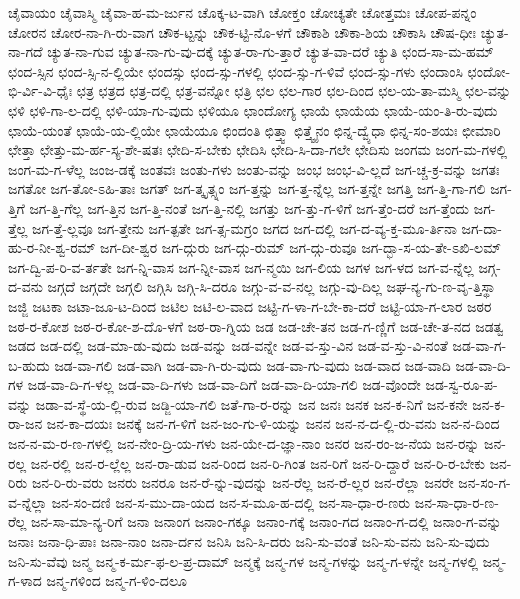 {ಚೈವಾಯಂ
ಚೈವಾಸ್ಮಿ
ಚೈವಾ-ಹ-ಮ-ರ್ಜುನ
ಚೊಕ್ಕ-ಟ-ವಾಗಿ
ಚೋಕ್ತಂ
ಚೋಚ್ಯತೇ
ಚೋತ್ತಮಃ
ಚೋಪ-ಪನ್ನಂ
ಚೋರನ
ಚೋರ-ನಾ-ಗಿ-ರು-ವಾಗ
ಚೌಕ-ಟ್ಟನ್ನು
ಚೌಕ-ಟ್ಟಿ-ನೊ-ಳಗೆ
ಚೌಕಾಶಿ
ಚೌಕಾ-ಶಿಯ
ಚೌಕಾಸಿ
ಚೌಷ-ಧೀಃ
ಚ್ಯುತ-ನಾ-ಗದೆ
ಚ್ಯುತ-ನಾ-ಗುವ
ಚ್ಯುತ-ನಾ-ಗು-ವು-ದಕ್ಕೆ
ಚ್ಯುತ-ರಾ-ಗು-ತ್ತಾರೆ
ಚ್ಯುತ-ವಾ-ದರೆ
ಚ್ಯುತಿ
ಛಂದ-ಸಾ-ಮ-ಹಮ್
ಛಂದ-ಸ್ಸಿನ
ಛಂದ-ಸ್ಸಿ-ನ-ಲ್ಲಿಯೇ
ಛಂದಸ್ಸು
ಛಂದ-ಸ್ಸು-ಗಳಲ್ಲಿ
ಛಂದ-ಸ್ಸು-ಗ-ಳಿವೆ
ಛಂದ-ಸ್ಸು-ಗಳು
ಛಂದಾಂಸಿ
ಛಂದೋ-ಭಿ-ರ್ವಿ-ವಿ-ಧೈಃ
ಛತ್ರ
ಛತ್ರದ
ಛತ್ರ-ದಲ್ಲಿ
ಛತ್ರ-ವನ್ನೋ
ಛತ್ರಿ
ಛಲ
ಛಲ-ಗಾರ
ಛಲ-ದಿಂದ
ಛಲ-ಯ-ತಾ-ಮಸ್ಮಿ
ಛಲ-ವನ್ನು
ಛಳಿ
ಛಳಿ-ಗಾ-ಲ-ದಲ್ಲಿ
ಛಳಿ-ಯಾ-ಗು-ವುದು
ಛಳಿಯೂ
ಛಾಂದೋಗ್ಯ
ಛಾಯೆ
ಛಾಯೆಯ
ಛಾಯೆ-ಯಂ-ತಿ-ರು-ವುದು
ಛಾಯೆ-ಯಂತೆ
ಛಾಯೆ-ಯ-ಲ್ಲಿಯೇ
ಛಾಯೆಯೂ
ಛಿಂದಂತಿ
ಛಿತ್ತ್ವಾ
ಛಿತ್ತ್ವೈನಂ
ಛಿನ್ನ-ದ್ವ್ಯೆಧಾ
ಛಿನ್ನ-ಸಂ-ಶಯಃ
ಛೀಮಾರಿ
ಛೇತ್ತಾ
ಛೇತ್ತು-ಮ-ರ್ಹ-ಸ್ಯ-ಶೇ-ಷತಃ
ಛೇದಿ-ಸ-ಬೇಕು
ಛೇದಿಸಿ
ಛೇದಿ-ಸಿ-ದಾ-ಗಲೇ
ಛೇದಿಸು
ಜಂಗಮ
ಜಂಗ-ಮ-ಗಳಲ್ಲಿ
ಜಂಗ-ಮ-ಗ-ಳೆಲ್ಲ
ಜಂಜ-ಡಕ್ಕೆ
ಜಂತವಃ
ಜಂತು-ಗಳು
ಜಂತು-ವನ್ನು
ಜಂಭ
ಜಂಭ-ವಿ-ಲ್ಲದೆ
ಜಗ-ಚ್ಚ-ಕ್ರ-ವನ್ನು
ಜಗತಃ
ಜಗತೋ
ಜಗ-ತೋ-ಽಹಿ-ತಾಃ
ಜಗತ್
ಜಗ-ತ್ಕೃತ್ಸ್ನಂ
ಜಗ-ತ್ತನ್ನು
ಜಗ-ತ್ತ-ನ್ನೆಲ್ಲ
ಜಗ-ತ್ತನ್ನೇ
ಜಗತ್ತಿ
ಜಗ-ತ್ತಿ-ಗಾ-ಗಲಿ
ಜಗ-ತ್ತಿಗೆ
ಜಗ-ತ್ತಿ-ಗೆಲ್ಲ
ಜಗ-ತ್ತಿನ
ಜಗ-ತ್ತಿ-ನಂತೆ
ಜಗ-ತ್ತಿ-ನಲ್ಲಿ
ಜಗತ್ತು
ಜಗ-ತ್ತು-ಗ-ಳಿಗೆ
ಜಗ-ತ್ತೆಂ-ದರೆ
ಜಗ-ತ್ತೆಂದು
ಜಗ-ತ್ತೆಲ್ಲ
ಜಗ-ತ್ತೆ-ಲ್ಲವೂ
ಜಗ-ತ್ತೇನು
ಜಗ-ತ್ಪತೇ
ಜಗ-ತ್ಸ-ಮಗ್ರಂ
ಜಗದ
ಜಗ-ದಲ್ಲಿ
ಜಗ-ದ-ವ್ಯ-ಕ್ತ-ಮೂ-ರ್ತಿನಾ
ಜಗ-ದಾ-ಹು-ರ-ನೀ-ಶ್ವ-ರಮ್
ಜಗ-ದೀ-ಶ್ವರ
ಜಗ-ದ್ಗುರು
ಜಗ-ದ್ಗು-ರುಮ್
ಜಗ-ದ್ಗು-ರುವೂ
ಜಗ-ದ್ಭಾ-ಸ-ಯ-ತೇ-ಽಖಿ-ಲಮ್
ಜಗ-ದ್ವಿ-ಪ-ರಿ-ವ-ರ್ತತೇ
ಜಗ-ನ್ನಿ-ವಾಸ
ಜಗ-ನ್ನೀ-ವಾಸ
ಜಗ-ನ್ಮಯಿ
ಜಗ-ಲಿಯ
ಜಗಳ
ಜಗ-ಳದ
ಜಗ-ವ-ನ್ನೆಲ್ಲ
ಜಗ್ಗ-ದ-ವನು
ಜಗ್ಗದೆ
ಜಗ್ಗದೇ
ಜಗ್ಗಲಿ
ಜಗ್ಗಿಸಿ
ಜಗ್ಗಿ-ಸಿ-ದರೂ
ಜಗ್ಗು-ವ-ವ-ನಲ್ಲ
ಜಗ್ಗು-ವು-ದಿಲ್ಲ
ಜಘ-ನ್ಯ-ಗು-ಣ-ವೃ-ತ್ತಿಸ್ಥಾ
ಜಜ್ಜಿ
ಜಟಕಾ
ಜಟಾ-ಜೂ-ಟ-ದಿಂದ
ಜಟಿಲ
ಜಟಿ-ಲ-ವಾದ
ಜಟ್ಟಿ-ಗ-ಳಾ-ಗ-ಬೇ-ಕಾ-ದರೆ
ಜಟ್ಟಿ-ಯಾ-ಗ-ಲಾರ
ಜಠರ
ಜಠ-ರ-ಕೋಶ
ಜಠ-ರ-ಕೋ-ಶ-ದೊ-ಳಗೆ
ಜಠ-ರಾ-ಗ್ನಿಯ
ಜಡ
ಜಡ-ಚೇ-ತನ
ಜಡ-ಗ-ಣ್ಣಿಗೆ
ಜಡ-ಚೇ-ತ-ನದ
ಜಡತ್ವ
ಜಡದ
ಜಡ-ದಲ್ಲಿ
ಜಡ-ಮಾ-ಡು-ವುದು
ಜಡ-ವನ್ನು
ಜಡ-ವನ್ನೇ
ಜಡ-ವ-ಸ್ತು-ವಿನ
ಜಡ-ವ-ಸ್ತು-ವಿ-ನಂತೆ
ಜಡ-ವಾ-ಗ-ಬ-ಹುದು
ಜಡ-ವಾ-ಗಲಿ
ಜಡ-ವಾಗಿ
ಜಡ-ವಾ-ಗಿ-ರು-ವುದು
ಜಡ-ವಾ-ಗು-ವುದು
ಜಡ-ವಾದ
ಜಡ-ವಾದಿ
ಜಡ-ವಾ-ದಿ-ಗಳ
ಜಡ-ವಾ-ದಿ-ಗ-ಳಲ್ಲ
ಜಡ-ವಾ-ದಿ-ಗಳು
ಜಡ-ವಾ-ದಿಗೆ
ಜಡ-ವಾ-ದಿ-ಯಾ-ಗಲಿ
ಜಡ-ವೊಂದೇ
ಜಡ-ಸ್ವ-ರೂ-ಪ-ವನ್ನು
ಜಡಾ-ವ-ಸ್ಥೆ-ಯ-ಲ್ಲಿ-ರುವ
ಜಡ್ಜಿ-ಯಾ-ಗಲಿ
ಜತೆ-ಗಾ-ರ-ರನ್ನು
ಜನ
ಜನಃ
ಜನಕ
ಜನ-ಕ-ನಿಗೆ
ಜನ-ಕನೇ
ಜನ-ಕ-ರಾ-ಜನ
ಜನ-ಕಾ-ದಯಃ
ಜನಕ್ಕೆ
ಜನ-ಗ-ಳಿಗೆ
ಜನ-ಜಂ-ಗು-ಳಿ-ಯನ್ನು
ಜನನ
ಜನ-ನ-ದ-ಲ್ಲಿ-ರು-ವನು
ಜನ-ನ-ದಿಂದ
ಜನ-ನ-ಮ-ರ-ಣ-ಗಳಲ್ಲಿ
ಜನ-ನೇಂ-ದ್ರಿ-ಯ-ಗಳು
ಜನ-ಯೇ-ದ-ಜ್ಞಾ-ನಾಂ
ಜನರ
ಜನ-ರಂ-ಜ-ನೆಯ
ಜನ-ರನ್ನು
ಜನ-ರಲ್ಲ
ಜನ-ರಲ್ಲಿ
ಜನ-ರ-ಲ್ಲೆಲ್ಲ
ಜನ-ರಾ-ಡುವ
ಜನ-ರಿಂದ
ಜನ-ರಿ-ಗಿಂತ
ಜನ-ರಿಗೆ
ಜನ-ರಿ-ದ್ದಾರೆ
ಜನ-ರಿ-ರ-ಬೇಕು
ಜನ-ರಿರು
ಜನ-ರಿ-ರು-ವರು
ಜನರು
ಜನರೂ
ಜನ-ರೆ-ನ್ನು-ವುದನ್ನು
ಜನ-ರೆಲ್ಲ
ಜನ-ರೆ-ಲ್ಲರ
ಜನ-ರೆಲ್ಲಾ
ಜನರೇ
ಜನ-ಸಂ-ಗ-ವ-ನ್ನೆಲ್ಲಾ
ಜನ-ಸಂ-ದಣಿ
ಜನ-ಸ-ಮು-ದಾ-ಯದ
ಜನ-ಸ-ಮೂ-ಹ-ದಲ್ಲಿ
ಜನ-ಸಾ-ಧಾ-ರ-ಣರು
ಜನ-ಸಾ-ಧಾ-ರ-ಣ-ರೆಲ್ಲ
ಜನ-ಸಾ-ಮಾ-ನ್ಯ-ರಿಗೆ
ಜನಾ
ಜನಾಂಗ
ಜನಾಂ-ಗಕ್ಕೂ
ಜನಾಂ-ಗಕ್ಕೆ
ಜನಾಂ-ಗದ
ಜನಾಂ-ಗ-ದಲ್ಲಿ
ಜನಾಂ-ಗ-ವನ್ನು
ಜನಾಃ
ಜನಾ-ಧಿ-ಪಾಃ
ಜನಾ-ನಾಂ
ಜನಾ-ರ್ದನ
ಜನಿಸಿ
ಜನಿ-ಸಿ-ದರು
ಜನಿ-ಸು-ವಂತೆ
ಜನಿ-ಸು-ವನು
ಜನಿ-ಸು-ವುದು
ಜನಿ-ಸು-ವೆವು
ಜನ್ಮ
ಜನ್ಮ-ಕ-ರ್ಮ-ಫ-ಲ-ಪ್ರ-ದಾಮ್
ಜನ್ಮಕ್ಕೆ
ಜನ್ಮ-ಗಳ
ಜನ್ಮ-ಗಳನ್ನು
ಜನ್ಮ-ಗ-ಳನ್ನೇ
ಜನ್ಮ-ಗಳಲ್ಲಿ
ಜನ್ಮ-ಗ-ಳಾದ
ಜನ್ಮ-ಗಳಿಂದ
ಜನ್ಮ-ಗ-ಳಿಂ-ದಲೂ
}
